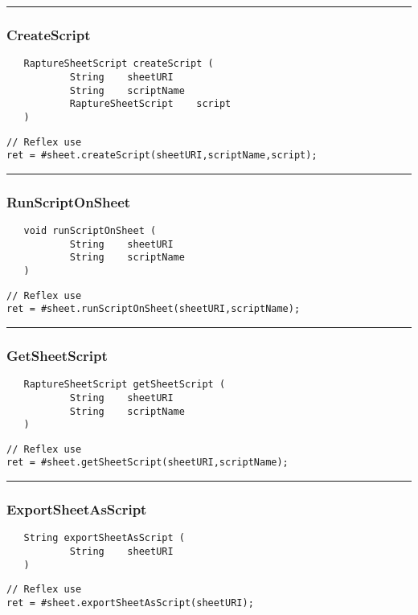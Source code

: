 \rule{15cm}{2pt}
\subsubsection{CreateScript}
\label{Api:CreateScript}
\begin{verbatim}
   RaptureSheetScript createScript (
           String    sheetURI
           String    scriptName
           RaptureSheetScript    script
   )
\end{verbatim}
\begin{lstlisting}[language=reflex]
// Reflex use
ret = #sheet.createScript(sheetURI,scriptName,script);
\end{lstlisting}



\rule{15cm}{2pt}
\subsubsection{RunScriptOnSheet}
\label{Api:RunScriptOnSheet}
\begin{verbatim}
   void runScriptOnSheet (
           String    sheetURI
           String    scriptName
   )
\end{verbatim}
\begin{lstlisting}[language=reflex]
// Reflex use
ret = #sheet.runScriptOnSheet(sheetURI,scriptName);
\end{lstlisting}



\rule{15cm}{2pt}
\subsubsection{GetSheetScript}
\label{Api:GetSheetScript}
\begin{verbatim}
   RaptureSheetScript getSheetScript (
           String    sheetURI
           String    scriptName
   )
\end{verbatim}
\begin{lstlisting}[language=reflex]
// Reflex use
ret = #sheet.getSheetScript(sheetURI,scriptName);
\end{lstlisting}



\rule{15cm}{2pt}
\subsubsection{ExportSheetAsScript}
\label{Api:ExportSheetAsScript}
\begin{verbatim}
   String exportSheetAsScript (
           String    sheetURI
   )
\end{verbatim}
\begin{lstlisting}[language=reflex]
// Reflex use
ret = #sheet.exportSheetAsScript(sheetURI);
\end{lstlisting}



